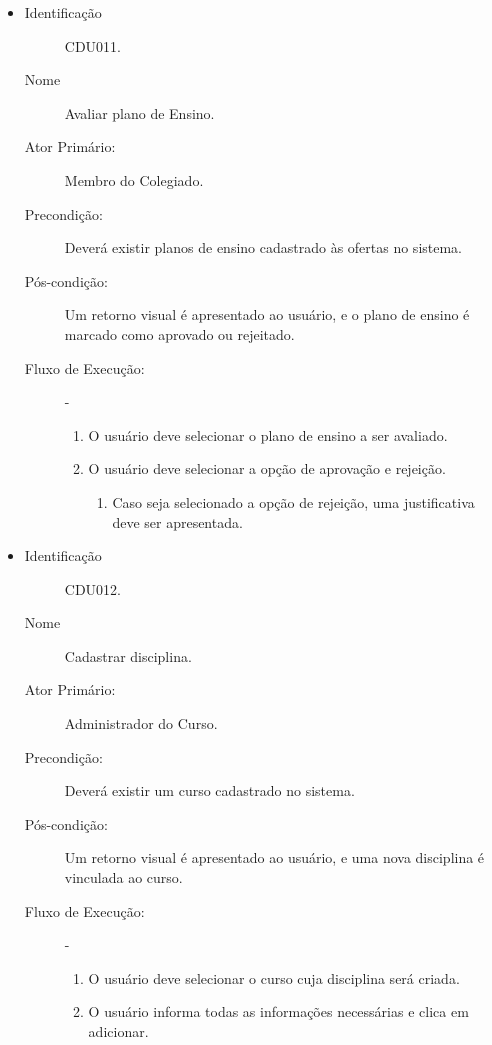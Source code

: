\begin{itemize}
    \item 
        \begin{description}
           \item[Identificação] CDU011.
           \item[Nome] Avaliar plano de Ensino.
           \item[Ator Primário:] Membro do Colegiado.
           \item[Precondição:] Deverá existir planos de ensino cadastrado às ofertas no sistema. 
           \item[Pós-condição:] Um retorno visual é apresentado ao usuário, e o plano de ensino é marcado como aprovado ou rejeitado.
           \item[Fluxo de Execução:] -
                \begin{enumerate}
                    \item O usuário deve selecionar o plano de ensino a ser avaliado.
                    \item O usuário deve selecionar a opção de aprovação e rejeição.
                    \begin{enumerate}
                    \item Caso seja selecionado a opção de rejeição, uma justificativa deve ser apresentada.
                    \end{enumerate}
                \end{enumerate}
        \end{description} 
    \vspace{10pt}

    \item 
        \begin{description}
           \item[Identificação] CDU012.
           \item[Nome] Cadastrar disciplina.
           \item[Ator Primário:] Administrador do Curso.
           \item[Precondição:] Deverá existir um curso cadastrado no sistema.
           \item[Pós-condição:] Um retorno visual é apresentado ao usuário, e uma nova disciplina é vinculada ao curso.
           \item[Fluxo de Execução:] -
                \begin{enumerate}
                    \item O usuário deve selecionar o curso cuja disciplina será criada.
                    \item O usuário informa todas as informações necessárias e clica em adicionar.
                \end{enumerate}
        \end{description} 
    \vspace{10pt}


\end{itemize}

